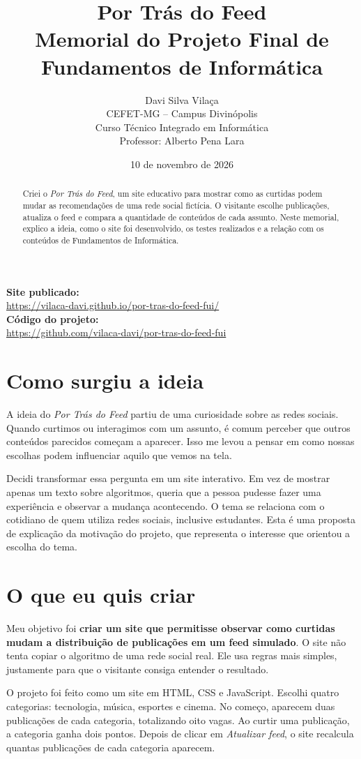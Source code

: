 \documentclass[11pt,a4paper]{article}
\title{\textbf{Por Trás do Feed}\\\large Memorial do Projeto Final de Fundamentos de Informática}
\author{Davi Silva Vilaça\\CEFET-MG -- Campus Divinópolis\\Curso Técnico Integrado em Informática\\Professor: Alberto Pena Lara}
\date{10 de novembro de 2026}
\begin{document}
\maketitle
\begin{center}\textbf{Site publicado:}\\\url{https://vilaca-davi.github.io/por-tras-do-feed-fui/}\\[3pt]\textbf{Código do projeto:}\\\url{https://github.com/vilaca-davi/por-tras-do-feed-fui}\end{center}
\begin{abstract}
Criei o \textit{Por Trás do Feed}, um site educativo para mostrar como as curtidas podem mudar as recomendações de uma rede social fictícia. O visitante escolhe publicações, atualiza o feed e compara a quantidade de conteúdos de cada assunto. Neste memorial, explico a ideia, como o site foi desenvolvido, os testes realizados e a relação com os conteúdos de Fundamentos de Informática.
\end{abstract}
\section{Como surgiu a ideia}
A ideia do \textit{Por Trás do Feed} partiu de uma curiosidade sobre as redes sociais. Quando curtimos ou interagimos com um assunto, é comum perceber que outros conteúdos parecidos começam a aparecer. Isso me levou a pensar em como nossas escolhas podem influenciar aquilo que vemos na tela.

Decidi transformar essa pergunta em um site interativo. Em vez de mostrar apenas um texto sobre algoritmos, queria que a pessoa pudesse fazer uma experiência e observar a mudança acontecendo. O tema se relaciona com o cotidiano de quem utiliza redes sociais, inclusive estudantes. Esta é uma proposta de explicação da motivação do projeto, que representa o interesse que orientou a escolha do tema.

\section{O que eu quis criar}
Meu objetivo foi \textbf{criar um site que permitisse observar como curtidas mudam a distribuição de publicações em um feed simulado}. O site não tenta copiar o algoritmo de uma rede social real. Ele usa regras mais simples, justamente para que o visitante consiga entender o resultado.

O projeto foi feito como um site em HTML, CSS e JavaScript. Escolhi quatro categorias: tecnologia, música, esportes e cinema. No começo, aparecem duas publicações de cada categoria, totalizando oito vagas. Ao curtir uma publicação, a categoria ganha dois pontos. Depois de clicar em \textit{Atualizar feed}, o site recalcula quantas publicações de cada categoria aparecem.
\end{document}

